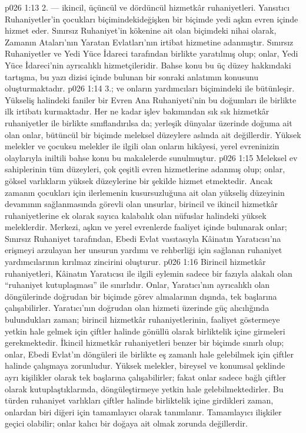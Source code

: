 \vs p026 1:13 2.\bibnobreakspace {} --- ikincil, üçüncül ve dördüncül hizmetkâr ruhaniyetleri. Yansıtıcı Ruhaniyetler’in çocukları biçimindekideğişken bir biçimde yedi aşkın evren içinde hizmet eder. Sınırsız Ruhaniyet’in kökenine ait olan biçimdeki  nihai olarak, Zamanın Ataları’nın Yaratan Evlatları’nın irtibat hizmetine adanmıştır.  Sınırsız Ruhaniyetler ve Yedi Yüce İdareci tarafından birlikte yaratılmış olup; onlar, Yedi Yüce İdareci’nin ayrıcalıklı hizmetçileridir. Bahse konu bu üç düzey hakkındaki tartışma, bu yazı dizisi içinde bulunan bir sonraki anlatımın konusunu oluşturmaktadır.
\vs p026 1:14 3.\bibnobreakspace {};  ve onların yardımcıları biçimindeki  ile bütünleşir. Yükseliş halindeki faniler bir Evren Ana Ruhaniyeti’nin bu doğumları ile birlikte ilk irtibatı kurmaktadır. Her ne kadar  işlev bakımından sık sık hizmetkâr ruhaniyetler ile birlikte sınıflandırılsa da; yerleşik dünyalar üzerinde doğuma ait olan onlar, bütüncül bir biçimde meleksel düzeylere aslında ait değillerdir. Yüksek melekler ve çocuksu melekler ile ilgili olan onların hikâyesi, yerel evreninizin olaylarıyla iniltili bahse konu bu makalelerde sunulmuştur.
\vs p026 1:15 Meleksel ev sahiplerinin tüm düzeyleri, çok çeşitli evren hizmetlerine adanmış olup; onlar, göksel varlıkların yüksek düzeylerine bir şekilde hizmet etmektedir. Ancak zamanın çocukları için ilerlemenin kusursuzluğuna ait olan yükseliş düzeyinin devamının sağlanmasında görevli olan unsurlar, birincil ve ikincil hizmetkâr ruhaniyetlerine ek olarak sayıca kalabalık olan nüfuslar halindeki yüksek meleklerdir. Merkezi, aşkın ve yerel evrenlerde faaliyet içinde bulunarak onlar; Sınırsız Ruhaniyet tarafından, Ebedi Evlat vasıtasıyla Kâinatın Yaratıcısı’na erişmeyi arzulayan her unsurun yardımı ve rehberliği için sağlanan ruhaniyet yardımcılarının kırılmaz zincirini oluşturur.
\vs p026 1:16 Birincil hizmetkâr ruhaniyetleri, Kâinatın Yaratıcısı ile ilgili eylemin sadece bir fazıyla alakalı olan “ruhaniyet kutuplaşması” ile sınırlıdır. Onlar, Yaratıcı’nın ayrıcalıklı olan döngülerinde doğrudan bir biçimde görev almalarının dışında, tek başlarına çalışabilirler. Yaratıcı’nın doğrudan olan hizmeti üzerinde güç alıcılığında bulundukları zaman; birincil hizmetkâr ruhaniyetlerinin, faaliyet göstermeye yetkin hale gelmek için çiftler halinde gönüllü olarak birliktelik içine girmeleri gerekmektedir. İkincil hizmetkâr ruhaniyetleri benzer bir biçimde sınırlı olup; onlar, Ebedi Evlat’ın döngüleri ile birlikte eş zamanlı hale gelebilmek için çiftler halinde çalışmaya zorunludur. Yüksek melekler, bireysel ve konumsal şeklinde ayrı kişilikler olarak tek başlarına çalışabilirler; fakat onlar sadece bağlı çiftler olarak kutuplaştıklarında, döngüleştirmeye yetkin hale gelebilmektedirler. Bu türden ruhaniyet varlıkları çiftler halinde birliktelik içine girdikleri zaman, onlardan biri diğeri için tamamlayıcı olarak tanımlanır. Tamamlayıcı ilişkiler geçici olabilir; onlar kalıcı bir doğaya ait olmak zorunda değillerdir.
